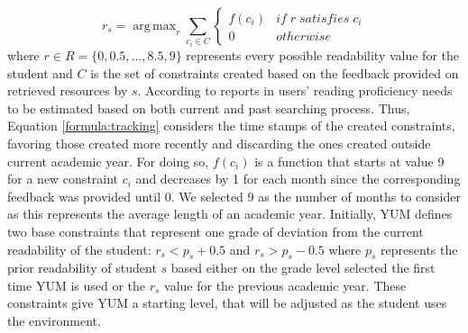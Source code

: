 \documentclass{sig-alternate-05-2015}
\DeclareMathOperator*{\argmaxA}{arg\,max} %
\begin{document}
\begin{equation}
r_s = \argmaxA_r  \sum_ {c_{i} \in C} \begin{cases}f(c_{i}) & if \; r \;  satisfies \; c_{i}\\0 & otherwise\end{cases}  
\label{formula:tracking}
\end{equation}
\noindent
where $r \in R=\{0,0.5,\dotsc ,8.5,9\}$ represents every possible readability value for the student and $C$ is the set of constraints created based on the feedback provided on retrieved resources by $s$. According to reports in \cite{Col11} users' reading proficiency needs to be estimated based on both current and past searching process. Thus, Equation \ref{formula:tracking} considers the time stamps of the created constraints, favoring those created more recently and discarding the ones created outside current academic year. For doing so, $f(c_i)$ is a function  that starts at value 9 for a new constraint $c_i$ and decreases by 1 for each month since the corresponding feedback was provided until 0. We selected 9 as the number of months to consider as this represents the average length of an academic year. %
Initially, YUM defines two base constraints that represent one grade of deviation from the current readability of the student: $r_s < p_s+0.5$ and $r_s > p_s -0.5$ where $p_s$ represents the prior readability of student $s$ based either on the grade level selected the first time YUM is used or the $r_s$ value for the previous academic year. These constraints give YUM a starting level, that will be adjusted as the student uses the environment. 
\end{document}
